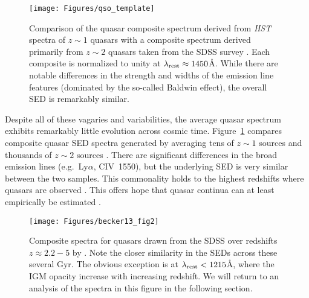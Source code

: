 \documentclass[graybox]{svmult}
\def\lya{Ly$\alpha$}
\begin{document}
%
\begin{figure}[b]
\sidecaption
\texttt{[image: Figures/qso\_template]}
%
%
\caption{Comparison of the quasar composite spectrum derived
from {\it HST} spectra of $z \sim 1$ quasars 
\cite{telfer02} with a composite spectrum derived
primarily from $z \sim 2$ quasars taken from the SDSS survey
\cite{vanden01}.  Each composite is normalized to unity
at $\lambda_{\rm rest} \approx 1450$\AA.
While there are notable differences in the
strength and widths of the emission line features (dominated
by the so-called Baldwin effect), the overall SED is remarkably
similar.  
}
\label{fig:qso_template}       %
\end{figure}



Despite all of these vagaries and variabilities, the average
quasar spectrum exhibits remarkably little evolution across
cosmic time.  Figure~\ref{fig:qso_template}
compares composite quasar SED spectra generated by
averaging tens of $z \sim 1$ sources \cite{telfer02}
and thousands of $z \sim 2$ sources \cite{vanden01}.
There are significant differences in the broad emission
lines (e.g.\ \lya, CIV~1550), but the underlying
SED is very similar between the two samples.  This commonality
holds to the highest redshifts where quasars are
observed \cite[Figure~\ref{fig:becker13_fig2}][]{becker+13}.
This offers hope that quasar continua can at least
empirically be estimated \cite{new_paper_by_AZ_guy}.



%
\begin{figure}[b]
\sidecaption
\texttt{[image: Figures/becker13\_fig2]}
%
%
\caption{Composite spectra for quasars drawn
from the SDSS over redshifts $z \approx 2.2-5$
by \cite{becker+13}.  Note the closer similarity
in the SEDs across these several Gyr.  The obvious
exception is at $\lambda_{\rm rest} < 1215$\AA, where
the IGM opacity increase with increasing redshift. 
We will return to an analysis of the spectra in this
figure in the following section.
}
\label{fig:becker13_fig2}       %
\end{figure}
\end{document}
